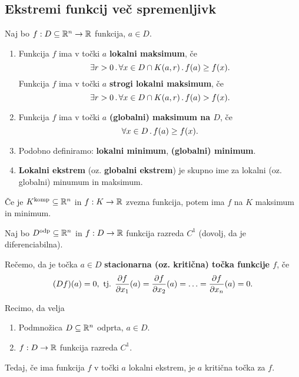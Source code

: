 \subsection{Ekstremi funkcij več spremenljivk}
\begin{definicija}
    Naj bo $f: D \subseteq \mathbb{R}^n \to \mathbb{R}$ funkcija, $a \in D$.
    \begin{enumerate}
        \item Funkcija $f$ ima v točki $a$ \textbf{lokalni maksimum}, če 
        $$\exists r>0 \,.\, \forall x \in D \cap K(a,r) \,.\, f(a) \geq f(x).$$ 
        Funkcija $f$ ima v točki $a$ \textbf{strogi lokalni maksimum}, če
        $$\exists r>0 \,.\, \forall x \in D \cap K(a,r) \,.\, f(a) > f(x).$$ 
        \item Funkcija $f$ ima v točki $a$ \textbf{(globalni) maksimum na $D$}, če 
        $$\forall x \in D \,.\, f(a) \geq f(x).$$
        \item Podobno definiramo: \textbf{lokalni minimum}, \textbf{(globalni) minimum}.
        \item \textbf{Lokalni ekstrem} (oz. \textbf{globalni ekstrem}) je skupno ime za lokalni (oz. globalni) minumum in maksimum.
    \end{enumerate}
\end{definicija}

\begin{opomba}
    Če je $K^\text{komp} \subseteq \mathbb{R}^n$ in $f: K \to \mathbb{R}$ zvezna funkcija, potem ima $f$ na $K$ maksimum in minimum.
\end{opomba}

\begin{definicija}
    Naj bo $D^\text{odp} \subseteq \mathbb{R}^n$ in $f: D \to \mathbb{R}$ funkcija razreda $C^1$ (dovolj, da je diferenciabilna). 
    
    Rečemo, da je točka $a \in D$ \textbf{stacionarna (oz. kritična) točka  funkcije $f$}, če $$(Df)(a) = 0, \text{ tj. } \frac{\partial f}{\partial x_1}(a) = \frac{\partial f}{\partial x_2}(a) = \ldots = \frac{\partial f}{\partial x_n}(a) = 0.$$
\end{definicija}

\begin{trditev}
    Recimo, da velja
    \begin{enumerate}
        \item Podmnožica $D \subseteq \mathbb{R}^n$ odprta, $a \in D$.
        \item $f: D \to \mathbb{R}$ funkcija razreda $C^1$.
    \end{enumerate}
    Tedaj, če ima funkcija $f$ v točki $a$ lokalni ekstrem, je $a$ kritična točka za $f$.
\end{trditev}


